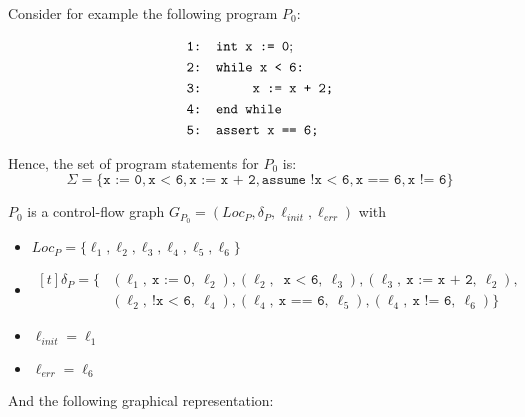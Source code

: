 \documentclass{article}
\newcommand{\tikzstmt}[3]{{%
\tikz[baseline]{%
	\node[st,fill=#2] at (0,.64ex){%
	\hspace{.3em}\texttt{\strut#3#1}\hspace{.3em}\strut};}
}}
\newcommand{\stfootcol}[2]{\tikzstmt{#1}{#2}{\footnotesize}}
\newcommand{\stfoot}[1]{\stfootcol{#1}{stmtcolor}}
\newcommand{\st}[1]{\stfoot{#1}}
\newcounter{example}[section]
\newcommand\mycom[1]{}
\newcommand\mycom[1]{#1}
\newcommand{\dd}[1]{\mycom{\todo[color=orange!40,inline]{\small DD: #1}}}
\begin{document}
\begin{example}
Consider for example the following program $P_0$:
\begin{figure}[H]
    \begin{align*}
        &\texttt{1: int x := 0}; \\
        &\texttt{2: while x < 6:} \\
        &\texttt{3: \hspace*{2em} x := x + 2;} \\
        &\texttt{4: end while} \\
        &\texttt{5: assert x == 6;}
    \end{align*}
    \label{fig:ex:p0}
\end{figure}
\dd{If you want I can add the listing code for nice looking Boogie programs}

Hence, the set of program statements for $P_0$ is: 
\begin{equation*}
    \Sigma = \{ \texttt{x := 0},\texttt{x < 6}, \texttt{x := x + 2}, \texttt{assume !x < 6}, \texttt{x == 6}, \texttt{x != 6} \}
\end{equation*} 

$P_0$ is a control-flow graph $G_{P_0} = (Loc_P, \delta_P, \ell_{init}, \ell_{err})$ with 
\begin{itemize}
    \item $Loc_P = \{ \ell_1, \ell_2, \ell_3, \ell_4, \ell_5, \ell_6 \}$
    \item $\begin{aligned}[t]	\delta_P = \{ &(\ell_1,\ \texttt{x := 0},\ \ell_2), (\ell_2,\ \texttt{ x < 6},\ \ell_3), (\ell_3,\ \texttt{x := x + 2},\ \ell_2), \\ &(\ell_2,\ \texttt{!x < 6},\ \ell_4), (\ell_4,\ \texttt{x == 6},\ \ell_5), (\ell_4,\ \texttt{x != 6},\ \ell_6)\} \end{aligned}$
    \item  $\ell_{init} = \ell_1$
    \item $\ell_{err} = \ell_6$
\end{itemize}
\dd{Do you want to use our fancy edge labels? I added them, they look like this \protect\st{x:=0}}


And the following graphical representation: 
\begin{figure}[H]
    \centering
    \begin{tikzpicture}[%
        ->,
        >=stealth', shorten >=1pt, auto,
        node distance=3cm, scale=1, 
        transform shape, align=center,    
        smallnode/.style={inner sep=1.4}
        initial text =]
       

\end{tikzpicture}
\end{figure}
\end{example}
\end{document}
